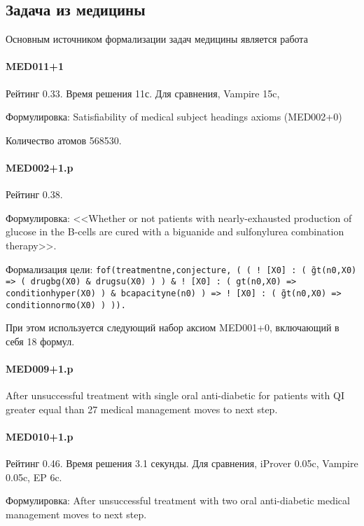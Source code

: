 \subsection{Задача из медицины}
Основным источником формализации задач медицины является работа \cite{med1}

\paragraph{MED011+1}
Рейтинг 0.33. Время решения 11с. Для сравнения, Vampire 15c,

Формулировка: Satisfiability of medical subject headings axioms (MED002+0)

Количество атомов 568530.


\paragraph{MED002+1.p}
Рейтинг 0.38.

Формулировка: <<Whether or not patients with nearly-exhausted production of glucose in the B-cells are cured with a biguanide and sulfonylurea combination therapy>>. 

Формализация цели:
\texttt{fof(treatmentne,conjecture,
    ( ( ! [X0] :
          ( \~ gt(n0,X0)
         => ( drugbg(X0)
            \& drugsu(X0) ) )
      \& ! [X0] :
          ( gt(n0,X0)
         => conditionhyper(X0) )
      \& bcapacityne(n0) )
   => ! [X0] :
        ( \~ gt(n0,X0)
       => conditionnormo(X0) ) )).}

При этом используется следующий набор аксиом MED001+0, включающий в себя 18 формул.

\paragraph{MED009+1.p}
After unsuccessful treatment with single oral anti-diabetic for patients with QI greater equal than 27 medical management moves to next step.

\paragraph{MED010+1.p}
Рейтинг 0.46. Время решения 3.1 секунды. Для сравнения, iProver 0.05c, Vampire 0.05c, EP 6c.

Формулировка: After unsuccessful treatment with two oral anti-diabetic medical management moves to next step.

